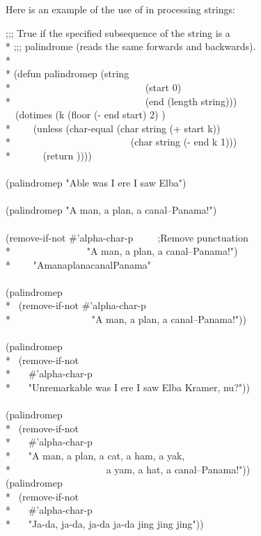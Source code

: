 \begin{defmac}
Here is an example of the use of  in processing strings:
\begin{lisp}
;;; True if the specified subsequence of the string is a \\*
;;; palindrome (reads the same forwards and backwards). \\*
\\*
(defun palindromep (string  \\*
~~~~~~~~~~~~~~~~~~~~~~~~~~~(start 0) \\*
~~~~~~~~~~~~~~~~~~~~~~~~~~~(end (length string))) \\
~~(dotimes (k (floor (- end start) 2) {\true}) \\*
~~~~(unless (char-equal (char string (+ start k)) \\*
~~~~~~~~~~~~~~~~~~~~~~~~(char string (- end k 1))) \\*
~~~~~~(return {\false})))) \\
\\
(palindromep "Able was I ere I saw Elba") \EV\ {\true} \\
 \\
(palindromep "A man, a plan, a canal--Panama!") \EV\ {\false} \\
 \\
(remove-if-not \#'alpha-char-p~~~~~;\textrm{Remove punctuation} \\*
~~~~~~~~~~~~~~~"A man, a plan, a canal--Panama!") \\*
~~~\EV\ "AmanaplanacanalPanama" \\
 \\
(palindromep \\*
~(remove-if-not \#'alpha-char-p \\*
~~~~~~~~~~~~~~~~"A man, a plan, a canal--Panama!")) \EV\ {\true} \\
 \\
(palindromep \\*
~(remove-if-not \\*
~~~\#'alpha-char-p \\*
~~~"Unremarkable was I ere I saw Elba Kramer, nu?")) \EV\ {\true} \\
 \\
(palindromep \\*
~(remove-if-not \\*
~~~\#'alpha-char-p \\*
~~~"A man, a plan, a cat, a ham, a yak, \\*
~~~~~~~~~~~~~~~~~~~a yam, a hat, a canal--Panama!")) \EV\ {\true}
\\
(palindromep \\*
~(remove-if-not \\*
~~~\#'alpha-char-p \\*
~~~"Ja-da, ja-da, ja-da ja-da jing jing jing")) \EV\ {\false}
\end{lisp}


\end{defmac}

